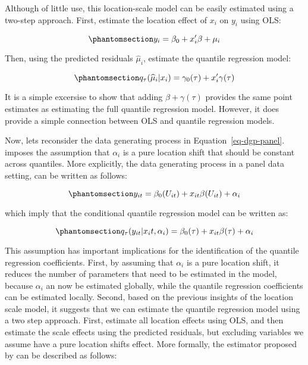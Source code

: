\documentclass[bib]{statapress}
\begin{document}
Although of little use, this location-scale model can be easily
estimated using a two-step approach. First, estimate the location effect
of \(x_i\) on \(y_i\) using OLS:

\begin{equation}\phantomsection\label{eq-ls-1}{y_i = \beta_0+x_i'\beta + \mu_i
}\end{equation}

Then, using the predicted residuals \(\hat \mu_i\), estimate the
quantile regression model:

\begin{equation}\phantomsection\label{eq-ls-2}{q_\tau(\hat \mu_i|x_i)=\gamma_0(\tau)+ x_i'\gamma(\tau)
}\end{equation}

It is a simple excersise to show that adding \(\beta+\gamma(\tau)\)
provides the same point estimates as estimating the full quantile
regression model. However, it does provide a simple connection between
OLS and quantile regression models.

Now, lets reconsider the data generating process in
Equation~\ref{eq-dgp-panel}. \citet{canay2011} imposes the assumption
that \(\alpha_i\) is a pure location shift that should be constant
across quantiles. More explicitly, the data generating process in a
panel data setting, can be written as follows:

\begin{equation}\phantomsection\label{eq-canay-dgp}{y_{it} = \beta_0(U_{it}) + x_{it}\beta(U_{it}) + \alpha_i
}\end{equation}

which imply that the conditional quantile regression model can be
written as:

\begin{equation}\phantomsection\label{eq-canay-qreg}{q_\tau(y_{it}|x_it,\alpha_i) = \beta_0(\tau) + x_{it}\beta(\tau) + \alpha_i
}\end{equation}

This assumption has important implications for the identification of the
quantile regression coefficients. First, by assuming that \(\alpha_i\)
is a pure location shift, it reduces the number of parameters that need
to be estimated in the model, because \(\alpha_i\) an now be estimated
globally, while the quantile regression coefficients can be estimated
locally. Second, based on the previous insights of the location scale
model, it suggests that we can estimate the quantile regression model
using a two step approach. First, estimate all location effects using
OLS, and then estimate the scale effects using the predicted residuals,
but excluding variables we assume have a pure location shifts effect.
More formally, the estimator proposed by \citet{canay2011} can be
described as follows:
\end{document}
